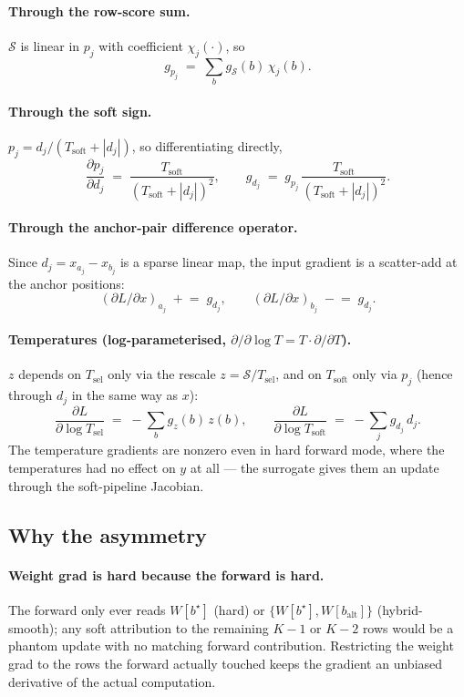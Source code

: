 \documentclass[11pt]{article}
\newcommand{\Tsel}{T_{\mathrm{sel}}}
\newcommand{\Tsoft}{T_{\mathrm{soft}}}
\newcommand{\bstar}{b^{\star}}
\begin{document}
\paragraph{Through the row-score sum.} $\mathcal S$ is linear in $p_j$ with coefficient $\chi_j(\cdot)$, so
\[
g_{p_j} \;=\; \sum_b g_{\mathcal S}(b)\, \chi_j(b).
\]

\paragraph{Through the soft sign.} $p_j = d_j/(\Tsoft + |d_j|)$, so differentiating directly,
\[
\frac{\partial p_j}{\partial d_j} \;=\; \frac{\Tsoft}{(\Tsoft + |d_j|)^2},
\qquad
g_{d_j} \;=\; g_{p_j}\,\frac{\Tsoft}{(\Tsoft + |d_j|)^2}.
\]

\paragraph{Through the anchor-pair difference operator.} Since $d_j = x_{a_j} - x_{b_j}$ is a sparse linear map, the input gradient is a scatter-add at the anchor positions:
\[
(\partial L/\partial x)_{a_j} \;\mathrel{+}=\; g_{d_j}, \qquad (\partial L/\partial x)_{b_j} \;\mathrel{-}=\; g_{d_j}.
\]

\paragraph{Temperatures (log-parameterised, $\partial/\partial \log T = T \cdot \partial/\partial T$).} $z$ depends on $\Tsel$ only via the rescale $z = \mathcal S / \Tsel$, and on $\Tsoft$ only via $p_j$ (hence through $d_j$ in the same way as $x$):
\[
\boxed{\;
\frac{\partial L}{\partial \log \Tsel} \;=\; -\sum_b g_z(b)\,z(b),
\qquad
\frac{\partial L}{\partial \log \Tsoft} \;=\; -\sum_j g_{d_j}\,d_j.
\;}
\]
The temperature gradients are nonzero even in hard forward mode, where the temperatures had no effect on $y$ at all --- the surrogate gives them an update through the soft-pipeline Jacobian.

\subsection{Why the asymmetry}
\label{ssec:asymmetry}

\paragraph{Weight grad is hard because the forward is hard.} The forward only ever reads $W[\bstar]$ (hard) or $\{W[\bstar], W[b_{\text{alt}}]\}$ (hybrid-smooth); any soft attribution to the remaining $K{-}1$ or $K{-}2$ rows would be a phantom update with no matching forward contribution. Restricting the weight grad to the rows the forward actually touched keeps the gradient an unbiased derivative of the actual computation.
\end{document}
